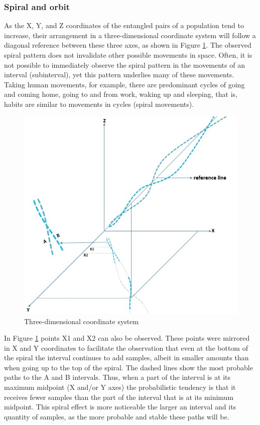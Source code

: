 \subsubsection{Spiral and orbit}
As the X, Y, and Z coordinates of the entangled pairs of a population tend to increase, their arrangement in a three-dimensional coordinate system will follow a diagonal reference between these three axes, as shown in Figure \ref{fig:consciousness_space_spiral_reference_line}. The observed spiral pattern does not invalidate other possible movements in space. Often, it is not possible to immediately observe the spiral pattern in the movements of an interval (subinterval), yet this pattern underlies many of these movements.  Taking human movements, for example, there are predominant cycles of going and coming home, going to and from work, waking up and sleeping, that is, habits are similar to movements in cycles (spiral movements).
	\begin{figure}[H]
	\caption{Three-dimensional coordinate system}
	\label{fig:consciousness_space_spiral_reference_line}
	\centering
	\includegraphics[scale=.7]{sections/images/consciousness_space_spiral_reference_line.jpg}
	\end{figure}

In Figure \ref{fig:consciousness_space_spiral_reference_line} points X1 and X2 can also be observed. These points were mirrored in X and Y coordinates to facilitate the observation that even at the bottom of the spiral the interval continues to add samples, albeit in smaller amounts than when going up to the top of the spiral. The dashed lines show the most probable paths to the A and B intervals. Thus, when a part of the interval is at its maximum midpoint (X and/or Y axes) the probabilistic tendency is that it receives fewer samples than the part of the interval that is at its minimum midpoint. This spiral effect is more noticeable the larger an interval and its quantity of samples, as the more probable and stable these paths will be.

